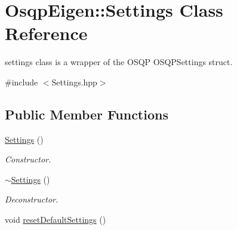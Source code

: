 \section{Osqp\+Eigen\+:\+:Settings Class Reference}
\label{classOsqpEigen_1_1Settings}


settings class is a wrapper of the O\+S\+QP O\+S\+Q\+P\+Settings struct.  




{\ttfamily \#include $<$Settings.\+hpp$>$}

\subsection*{Public Member Functions}
\begin{DoxyCompactItemize}
\item 
\hyperlink{classOsqpEigen_1_1Settings_a0f16a3c4db592ce554ceacf2d5bff49d}{Settings} ()\label{classOsqpEigen_1_1Settings_a0f16a3c4db592ce554ceacf2d5bff49d}

\begin{DoxyCompactList}\small\item\em Constructor. \end{DoxyCompactList}\item 
\hyperlink{classOsqpEigen_1_1Settings_aa4dd86dacba75b83123d1933e944e0e8}{$\sim$\+Settings} ()\label{classOsqpEigen_1_1Settings_aa4dd86dacba75b83123d1933e944e0e8}

\begin{DoxyCompactList}\small\item\em Deconstructor. \end{DoxyCompactList}\item 
void \hyperlink{classOsqpEigen_1_1Settings_a31f9fb782dc1bcdbe79981bc6464c8af}{reset\+Default\+Settings} ()\label{classOsqpEigen_1_1Settings_a31f9fb782dc1bcdbe79981bc6464c8af}


\end{DoxyCompactItemize}
